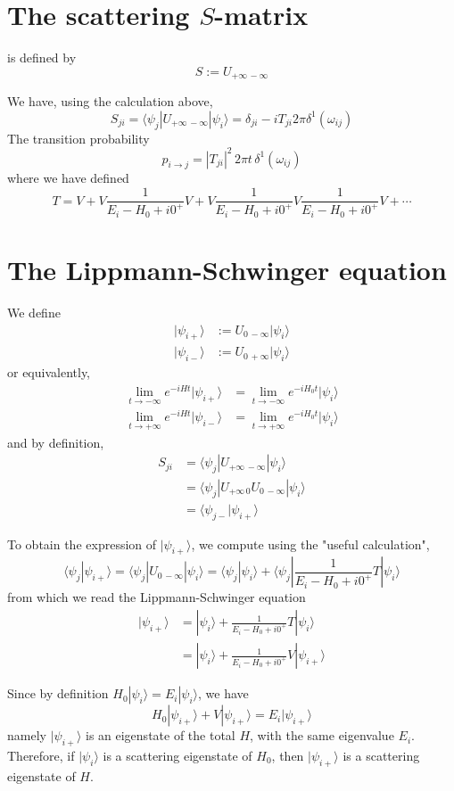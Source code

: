 \documentclass[12pt, oneside]{book}
\begin{document}
\section*{The scattering $S$-matrix}
is defined by
\[
S:=U_{+\infty\,-\infty}
\]

We have, using the calculation above,
\[
S_{ji}=\langle\psi_j|U_{+\infty\,-\infty}|\psi_i\rangle=\delta_{ji}-iT_{ji}2\pi\delta^1(\omega_{ij})
\]
The transition probability
\[
p_{i\to j}=|T_{ji}|^2\,2\pi t\,\delta^1(\omega_{ij})
\]
where we have defined
\[
T=V+V\frac1{E_i-H_0+i0^+}V+V\frac1{E_i-H_0+i0^+}V\frac1{E_i-H_0+i0^+}V+\cdots
\]

\section*{The Lippmann-Schwinger equation}
We define
\begin{align*}
|\psi_{i+}\rangle&:=U_{0\,-\infty}|\psi_i\rangle\\
|\psi_{i-}\rangle&:=U_{0\,+\infty}|\psi_i\rangle
\end{align*}
or equivalently,
\begin{align*}
\lim_{t\to-\infty}e^{-iHt}|\psi_{i+}\rangle&=\lim_{t\to-\infty}e^{-iH_0t}|\psi_i\rangle\\
\lim_{t\to+\infty}e^{-iHt}|\psi_{i-}\rangle&=\lim_{t\to+\infty}e^{-iH_0t}|\psi_i\rangle
\end{align*}
and by definition,
\begin{align*}
S_{ji}
&=\langle\psi_j|U_{+\infty\,-\infty}|\psi_i\rangle\\
&=\langle\psi_j|U_{+\infty\,0}U_{0\,-\infty}|\psi_i\rangle\\
&=\langle\psi_{j-}|\psi_{i+}\rangle
\end{align*}

To obtain the expression of $|\psi_{i+}\rangle$, we compute using the "useful calculation",
\[
\langle\psi_j|\psi_{i+}\rangle=\langle\psi_j|U_{0\,-\infty}|\psi_i\rangle=\langle\psi_j|\psi_i\rangle+\langle\psi_j|\frac1{E_i-H_0+i0^+}T|\psi_i\rangle
\]
from which we read the Lippmann-Schwinger equation
\begin{align*}
|\psi_{i+}\rangle
&=|\psi_i\rangle+\frac1{E_i-H_0+i0^+}T|\psi_i\rangle\\
&=|\psi_i\rangle+\frac1{E_i-H_0+i0^+}V|\psi_{i+}\rangle
\end{align*}

Since by definition $H_0|\psi_i\rangle=E_i|\psi_i\rangle$, we have
\[
H_0|\psi_{i+}\rangle+V|\psi_{i+}\rangle=E_i|\psi_{i+}\rangle
\]
namely $|\psi_{i+}\rangle$ is an eigenstate of the total $H$, with the same eigenvalue $E_i$. Therefore, if $|\psi_i\rangle$ is a scattering eigenstate of $H_0$, then $|\psi_{i+}\rangle$ is a scattering eigenstate of $H$.
\end{document}
